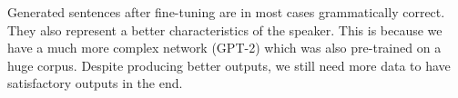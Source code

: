 \documentclass[11pt]{article}
\begin{document}
Generated sentences after fine-tuning are in most cases grammatically correct. They also represent a better characteristics of the speaker. This is because we have a much more complex network (GPT-2) which was also pre-trained on a huge corpus. Despite producing better outputs, we still need more data to have satisfactory outputs in the end.






\end{document}
